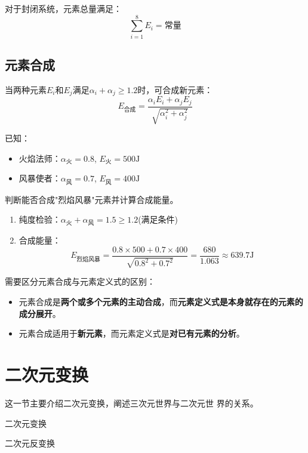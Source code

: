\documentclass[lang=cn,newtx,10pt,scheme=chinese]{elegantbook}
\begin{document}
\begin{axiom}[元素守恒]
    对于封闭系统，元素总量满足：
    \[
        \sum_{i=1}^8 E_i = \text{常量}
    \]
\end{axiom}

\subsection{元素合成}
\begin{definition}[元素合成]
    当两种元素$E_i$和$E_j$满足$\alpha_i + \alpha_j \geq 1.2$时，可合成新元素：
    $$
        E_{\text{合成}} = \frac{\alpha_i E_i + \alpha_j E_j}{\sqrt{\alpha_i^2 + \alpha_j^2}}
    $$
\end{definition}

\begin{example}[元素合成计算]
    已知：
    \begin{itemize}
        \item 火焰法师：$\alpha_{\text{火}}=0.8$, $E_{\text{火}}=500\text{J}$
        \item 风暴使者：$\alpha_{\text{风}}=0.7$, $E_{\text{风}}=400\text{J}$
    \end{itemize}
    判断能否合成"烈焰风暴"元素并计算合成能量。

    \solution
    \begin{enumerate}
        \item 纯度检验：$\alpha_{\text{火}} + \alpha_{\text{风}} = 1.5 \geq 1.2$(满足条件)
        \item 合成能量：
              $$
                  E_{\text{烈焰风暴}} = \frac{0.8 \times 500 + 0.7 \times 400}{\sqrt{0.8^2 + 0.7^2}} = \frac{680}{1.063} \approx 639.7\text{J}
              $$
    \end{enumerate}
\end{example}

需要区分元素合成与元素定义式的区别：
\begin{itemize}
    \item 元素合成是\textbf{两个或多个元素的主动合成}，而\textbf{元素定义式是本身就存在的元素的成分展开}。
    \item 元素合成适用于\textbf{新元素}，而元素定义式是\textbf{对已有元素的分析}。
\end{itemize}

\section{二次元变换}
这一节主要介绍二次元变换，阐述三次元世界与二次元世
界的关系。
\begin{introduction}
    \item 二次元变换
    \item 二次元反变换
\end{introduction}
\end{document}

